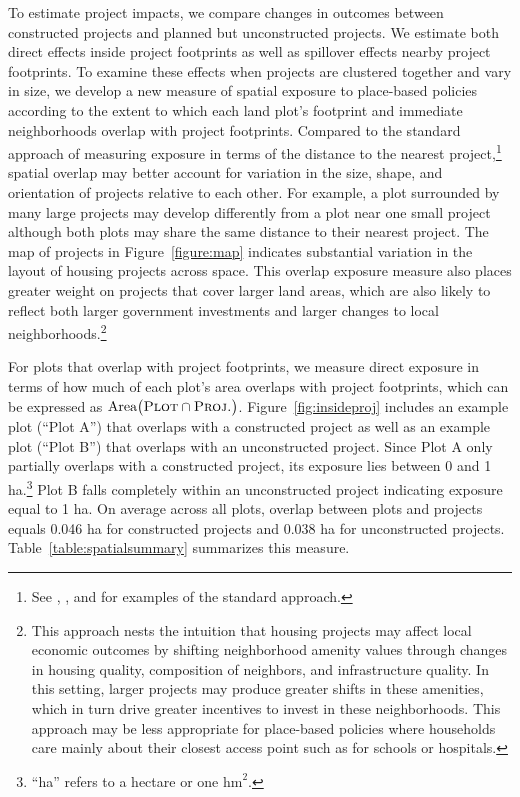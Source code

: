 \documentclass[12pt]{article}
\newcommand{\haref}{
	``ha'' refers to a hectare or one $\text{hm}^{2}$.
}
\begin{document}
To estimate project impacts, we compare changes in outcomes between constructed projects and planned but unconstructed projects.  We estimate both direct effects inside project footprints as well as spillover effects nearby project footprints.  To examine these effects when projects are clustered together and vary in size, we develop a new measure of spatial exposure to place-based policies according to the extent to which each land plot's footprint and immediate neighborhoods overlap with project footprints.  Compared to the standard approach of measuring exposure in terms of the distance to the nearest project,\footnote{See \cite{diamond2016wants}, \cite{rossi2010housing}, and \cite{neumark2015place} for examples of the standard approach.} spatial overlap may better account for variation in the size, shape, and orientation of projects relative to each other.  For example, a plot surrounded by many large projects may develop differently from a plot near one small project although both plots may share the same distance to their nearest project.  The map of projects in Figure~\ref{figure:map} indicates substantial variation in the layout of housing projects across space.  This overlap exposure measure also places greater weight on projects that cover larger land areas, which are also likely to reflect both larger government investments and larger changes to local neighborhoods.\footnote{This approach nests the intuition that housing projects may affect local economic outcomes by shifting neighborhood amenity values through changes in housing quality, composition of neighbors, and infrastructure quality.  In this setting, larger projects may produce greater shifts in these amenities, which in turn drive greater incentives to invest in these neighborhoods.  This approach may be less appropriate for place-based policies where households care mainly about their closest access point such as for schools or hospitals.}

For plots that overlap with project footprints, we measure direct exposure in terms of how much of each plot's area overlaps with project footprints, which can be expressed as $\text{Area}\big(\textsc{Plot}  \cap  \textsc{Proj.}\big)$.  Figure~\ref{fig:insideproj} includes an example plot (``Plot A'') that overlaps with a constructed project as well as an example plot (``Plot B'') that overlaps with an unconstructed project.  Since Plot A only partially overlaps with a constructed project, its exposure lies between 0 and 1 ha.\footnote{\haref}  Plot B falls completely within an unconstructed project indicating exposure equal to 1 ha.  On average across all plots, overlap between plots and projects equals 0.046 ha for constructed projects and 0.038 ha for unconstructed projects. Table~\ref{table:spatialsummary} summarizes this measure.
\end{document}
